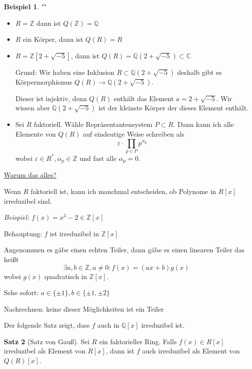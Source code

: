 \documentclass[12pt,parskip=full]{scrartcl}
\newcommand{\setZ}{\mathbb{Z}}
\newcommand{\setQ}{\mathbb{Q}}
\newcommand{\setC}{\mathbb{C}}
\newcommand{\heading}{\underline}
\theoremstyle{definition}
\newtheorem{theorem}{Satz}[section]
\newtheorem{example}[theorem]{Beispiel}
\theoremstyle{remark}
\begin{document}
	\begin{example}""
		\begin{itemize}
			\item $R = \setZ$ dann ist $Q(\setZ) = \setQ$
			\item $R$ ein Körper, dann ist $Q(R) = R$
			\item $R = \setZ[2 + \sqrt{-5}]$, dann ist $Q(R) = \setQ(2 + \sqrt{-5}) \subset \setC$
			
			Grund: Wir haben eine Inklusion $R \subset \setQ(2 + \sqrt{-5})$ deshalb gibt es Körpermorphismus $Q(R) \to \setQ(2 + \sqrt{-5})$.
			
			Dieser ist injektiv, denn $Q(R)$ enthält das Element $a = 2 + \sqrt{-5}$. Wir wissen aber $\setQ(2 + \sqrt{-5})$ ist der kleinste Körper der dieses Element enthält.
			\item Sei $R$ faktoriell. Wähle Repräsentantensystem $P \subset R$. Dann kann ich alle Elemente von $Q(R)$ auf eindeutige Weise schreiben als
			\begin{equation*}
				\varepsilon \cdot \prod_{p \in P} p^{\alpha_p}
			\end{equation*}
			wobei $\varepsilon \in R^*, \alpha_p \in \setZ$ und fast alle $\alpha_p = 0$.
		\end{itemize}
	\end{example}

	\heading{Warum das alles?}
	
	Wenn $R$ faktoriell ist, kann ich manchmal entscheiden, ob Polynome in $R[x]$ irreduzibel sind.
	
	\textit{Beispiel:} $f(x) = x^3 - 2 \in \setZ[x]$
	
	Behauptung: $f$ ist irreduzibel in $\setZ[x]$
	
	Angenommen es gäbe einen echten Teiler, dann gäbe es einen linearen Teiler das heißt
	\begin{equation*}
		\exists a,b \in \setZ, a \neq 0: f(x) = (ax + b) g(x)
	\end{equation*}
	wobei $g(x)$ quadratisch in $\setZ[x]$.
	
	Sehe sofort: $a \in \{ \pm 1 \}, b \in \{ \pm 1, \pm 2 \}$
	
	Nachrechnen: keine dieser Möglichkeiten ist ein Teiler
	
	Der folgende Satz zeigt, dass $f$ auch in $\setQ[x]$ irreduzibel ist.
	
	\begin{theorem}[Satz von Gauß]
		Sei $R$ ein faktorieller Ring. Falls $f(x) \in R[x]$ irreduzibel als Element von $R[x]$, dann ist $f$ auch irreduzibel als Element von $Q(R)[x]$.
	\end{theorem}
\end{document}
